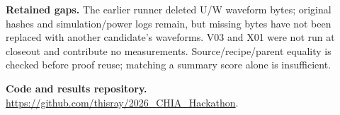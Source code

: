 \documentclass[10pt]{article}
\begin{document}
\textbf{Retained gaps.} The earlier runner deleted U/W waveform bytes; original hashes and simulation/power logs remain, but missing bytes have not been replaced with another candidate's waveforms. V03 and X01 were not run at closeout and contribute no measurements. Source/recipe/parent equality is checked before proof reuse; matching a summary score alone is insufficient.

\textbf{Code and results repository.} \url{https://github.com/thisray/2026_CHIA_Hackathon}.
\end{document}
